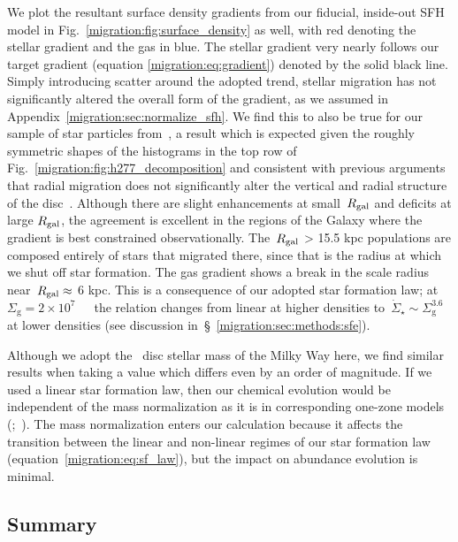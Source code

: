 We plot the resultant surface density gradients from our fiducial, inside-out 
SFH model in Fig.~\ref{migration:fig:surface_density} as well, with red denoting the 
stellar gradient and the gas in blue. 
The stellar gradient very nearly follows our target gradient (equation 
\ref{migration:eq:gradient}) denoted by the solid black line. 
Simply introducing scatter around the adopted trend, stellar migration has 
not significantly altered the overall form of the gradient, as we assumed in 
Appendix~\ref{migration:sec:normalize_sfh}. 
We find this to also be true for our sample of star particles from~\hsim, 
a result which is expected given the roughly symmetric shapes of the 
histograms in the top row of Fig.~\ref{migration:fig:h277_decomposition} and consistent 
with previous arguments that radial migration does not significantly alter the 
vertical and radial structure of the disc~\citep[e.g.][]{Sellwood2014, 
VeraCiro2014}. 
Although there are slight enhancements at small~$R_\text{gal}$ and deficits at large 
$R_\text{gal}$, the agreement is excellent in the regions of the Galaxy where the 
gradient is best constrained observationally. 
The~$R_\text{gal}$ > 15.5 kpc populations are composed entirely of stars that 
migrated there, since that is the radius at which we shut off star formation. 
The gas gradient shows a break in the scale radius near~$R_\text{gal} \approx$ 
6 kpc. This is a consequence of our adopted star formation law; at 
$\Sigma_\text{g} = 2\times10^7$~\msun~\persqkpc~the relation changes from 
linear at higher densities to~$\dot{\Sigma}_\star \sim \Sigma_\text{g}^{3.6}$ 
at lower densities (see discussion in~\S~\ref{migration:sec:methods:sfe}). 
\par 
Although we adopt the~\citet{Licquia2015} disc stellar mass of the Milky Way 
here, we find similar results when taking a value which differs even by an 
order of magnitude. 
If we used a linear star formation law, then our chemical evolution would be 
independent of the mass normalization as it is in corresponding one-zone 
models (\citealp*{Spitoni2017};~\citealp{Weinberg2017b, Belfiore2019}). 
The mass normalization enters our calculation because it affects the transition 
between the linear and non-linear regimes of our star formation law 
(equation~\ref{migration:eq:sf_law}), but the impact on abundance evolution is minimal. 

\subsection{Summary} 
\label{migration:sec:methods:summary} 

